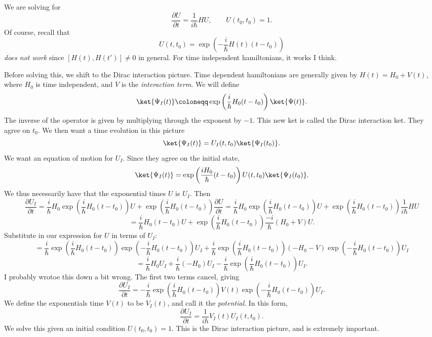 
We are solving for
\[
	\frac{\partial U}{\partial t} =\frac{1}{i \hbar} HU,\qquad U(t_0,t_0)=1
.\]
Of course, recall that
\[
	U(t,t_0)=\exp \left( -\frac{i}{\hbar} H(t)(t-t_0) \right) 
\]
\emph{does not work} since $\left[ H(t),H(t') \right] \neq 0$ in general. For time independent hamiltonians, it works I think.

Before solving this, we shift to the Dirac interaction picture. Time dependent hamiltonians are generally given by $H(t)=H_0+V(t)$, where $H_0$ is time independent, and $V$ is the \emph{interaction term}. We will define
\[
	\ket{\Psi _I(t)}\coloneqq \exp \left( \frac{i}{\hbar} H_0(t-t_0) \right) \ket{\Psi (t)}
.\]
The inverse of the operator is given by multiplying through the exponent by $-1$. This new ket is called the Dirac interaction ket. They agree on $t_0$. We then want a time evolution in this picture
\[
	\ket{\Psi _I(t)}=U_I(t,t_0)\ket{\Psi _I(t_0)}
.\]
We want an equation of motion for $U_I$. Since they agree on the initial state,
\[
	\ket{\Psi _I(t)}=\exp \left( \frac{iH_0}{\hbar} (t-t_0) \right) U(t,t_0)\ket{\Psi _I(t_0)}
.\]
We thus necessarily have that the exponential times $U$ is $U_I$. Then
\[
	\frac{\partial U_I}{\partial t} =\frac{i}{\hbar} H_0\exp\left( \frac{i}{\hbar} H_0(t-t_0) \right) U+\exp \left( \frac{i}{\hbar} H_0(t-t_0) \right) \frac{\partial U}{\partial t} =\frac{i}{\hbar} H_0\exp\left( \frac{i}{\hbar} H_0(t-t_0) \right) U+\exp \left( \frac{i}{\hbar} H_0(t-t_0) \right) \frac{1}{i\hbar} HU
\]
\[
	=\frac{i}{\hbar} H_0(t-t_0)U+\exp \left( \frac{i}{\hbar} H_0(t-t_0) \right) \frac{-i}{\hbar} (H_0+V)U
.\]
Substitute in our expression for $U$ in terms of $U_I$:
\[	
	=\frac{i}{\hbar}  \exp \left( \frac{i}{\hbar} H_0(t-t_0) \right)\exp \left( -\frac{i}{\hbar} H_0(t-t_0) \right) U_I+\frac{i}{\hbar} \exp \left( \frac{i}{\hbar} H_0(t-t_0) \right) (-H_0-V)\exp \left( -\frac{i}{\hbar} H_0(t-t_0) \right) U_I
\]
\[
	=\frac{i}{\hbar} H_0U_I + \frac{i}{\hbar} (-H_0)U_I - \frac{i}{\hbar} \exp \left( \frac{i}{\hbar} H_0(t-t_0) \right) U_I
.\]
I probably wrotoe this down a bit wrong. The first two terms cancel, giving
\[
	\frac{\partial U_I}{\partial t} =-\frac{i}{\hbar} \exp \left( \frac{i}{\hbar} H_0(t-t_0) \right) V(t)\exp \left( -\frac{i}{\hbar} H_0(t-t_0) \right) U_I
.\]
We define the exponentials time $V(t)$ to be $V_I(t)$, and call it the \emph{potential}. In this form,
\[
	\frac{\partial U_I}{\partial t} =\frac{1}{i\hbar} V_I(t)U_I(t,t_0)
.\]
We solve this given an initial condition $U(t_0,t_0)=1$. This is the Dirac interaction picture, and is extremely important.

